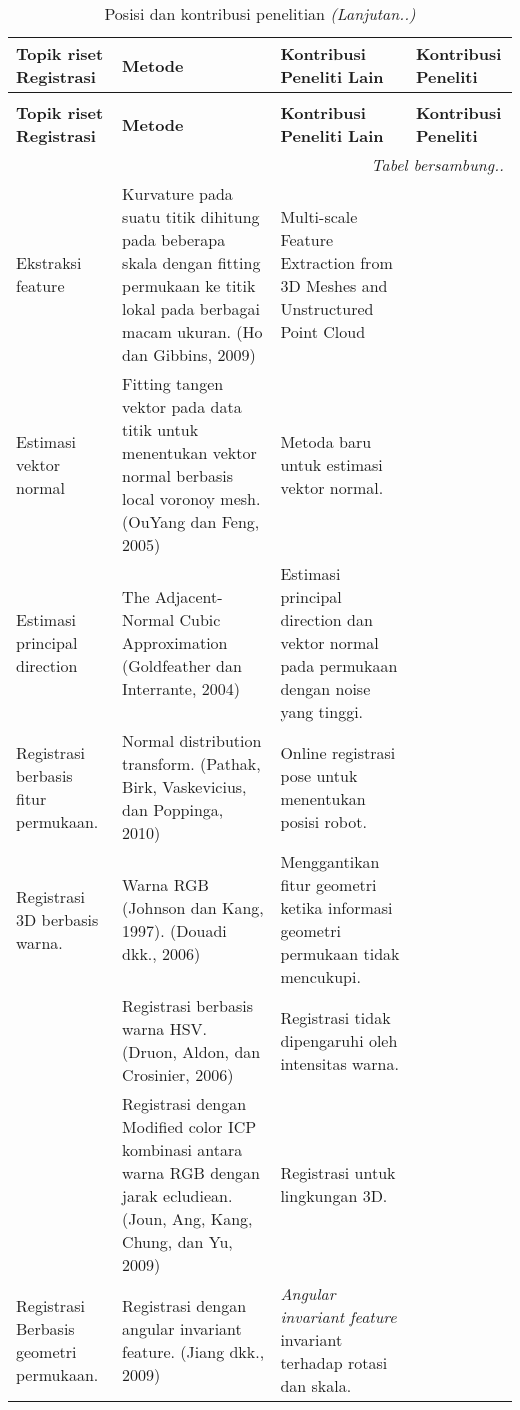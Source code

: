 \documentclass{article}
\begin{document}
	
	\begin{longtable}{|p{3cm}| p{7cm} | p{7cm} | p{7cm}|}
		\caption{Posisi dan kontribusi penelitian}\label{table:Posisidankontribusipenelitian} \\ \hline
		\textbf{Topik riset Registrasi} & 
		\textbf{Metode} & 
		\textbf{Kontribusi Peneliti Lain} &
		\textbf{Kontribusi Peneliti} \\ \hline
		\endfirsthead
		\caption[]{Posisi dan kontribusi penelitian \textit{(Lanjutan..)}}\\ \hline
		\textbf{Topik riset Registrasi} & 
		\textbf{Metode} & 
		\textbf{Kontribusi Peneliti Lain} &
		\textbf{Kontribusi Peneliti} \\ \hline
		\endhead
		\multicolumn{4}{r}{{\textit{Tabel bersambung..}}} \\ \hline
		\endfoot
		\endlastfoot 
		Ekstraksi feature & Kurvature pada suatu titik dihitung pada beberapa skala dengan fitting permukaan ke titik lokal pada berbagai macam ukuran. (Ho dan Gibbins, 2009) & Multi-scale Feature Extraction from 3D Meshes and Unstructured Point Cloud & \\ \hline 
		Estimasi vektor normal & Fitting tangen vektor pada data titik untuk menentukan vektor normal berbasis local voronoy mesh. (OuYang dan Feng, 2005) & Metoda baru untuk estimasi vektor normal. & \\ \hline 
		Estimasi principal direction & The Adjacent-Normal Cubic Approximation (Goldfeather dan Interrante, 2004) & Estimasi principal direction dan vektor normal pada permukaan dengan noise yang tinggi. &\\ \hline 
		Registrasi berbasis fitur permukaan. & Normal distribution transform. (Pathak, Birk, Vaskevicius, dan Poppinga, 2010) & Online registrasi pose untuk menentukan posisi robot. & \\ \hline 
		Registrasi 3D berbasis warna. & Warna RGB (Johnson dan Kang, 1997). (Douadi dkk., 2006) & Menggantikan fitur geometri ketika informasi geometri permukaan tidak mencukupi. & \\ \hline 
		& Registrasi berbasis warna HSV. (Druon, Aldon, dan Crosinier, 2006) & Registrasi tidak dipengaruhi oleh intensitas warna. & \\ \hline 
		& Registrasi dengan Modified color ICP kombinasi antara warna RGB dengan jarak ecludiean. (Joun, Ang, Kang, Chung, dan Yu, 2009) & Registrasi untuk lingkungan 3D. & \\ \hline 
		Registrasi Berbasis geometri permukaan. & Registrasi dengan angular invariant feature. (Jiang dkk., 2009) & \textit{Angular invariant feature} invariant terhadap rotasi dan skala. & \\ \hline 

\end{longtable}
\end{document}
